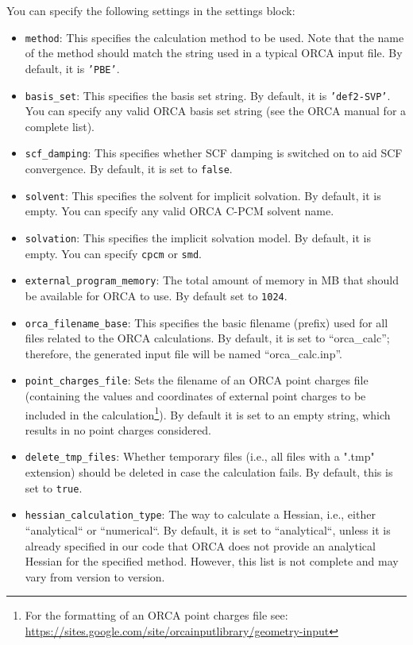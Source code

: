 \documentclass[]{tufte-book}
\begin{document}
You can specify the following settings in the settings block:
\begin{itemize}
\item \texttt{method}: This specifies the calculation method to be used.
Note that the name of the method should match the string used in a typical \textsc{ORCA} input file.
By default, it is \texttt{'PBE'}.
\item \texttt{basis\_set}: This specifies the basis set string. By default, it is \texttt{'def2-SVP'}. You can specify
any valid ORCA basis set string (see the \textsc{ORCA} manual for a complete list).
\item \texttt{scf\_damping}: This specifies whether SCF damping is switched on to aid SCF convergence. By default, it is set to \texttt{false}.
\item \texttt{solvent}: This specifies the solvent for implicit solvation. By default, it is empty. You can specify any valid \textsc{ORCA} C-PCM solvent name.
\item \texttt{solvation}: This specifies the implicit solvation model. By default, it is empty. You can specify \texttt{cpcm} or \texttt{smd}.
\item \texttt{external\_program\_memory}: The total amount of memory in MB that should be available for \textsc{ORCA} to use.
By default set to \texttt{1024}.
\item \texttt{orca\_filename\_base}: This specifies the basic filename (prefix) used for all files related to the \textsc{ORCA} calculations.
By default, it is set to ``orca\_calc''; therefore, the generated input file will be named ``orca\_calc.inp''.
\item \texttt{point\_charges\_file}: Sets the filename of an \textsc{ORCA} point charges file (containing the values and coordinates of
external point charges to be included in the calculation\footnote{For the formatting of an \textsc{ORCA} point charges file see: \url{https://sites.google.com/site/orcainputlibrary/geometry-input}}).
By default it is set to an empty string, which results
in no point charges considered.
\item \texttt{delete\_tmp\_files}: Whether temporary files (i.e., all files with a ".tmp" extension) should be deleted in case
the calculation fails. By default, this is set to \texttt{true}.
\item \texttt{hessian\_calculation\_type}: The way to calculate a Hessian, i.e., either ``analytical`` or ``numerical``. By default, it is set to ``analytical``, unless it is already specified in our code that \textsc{ORCA} does not provide an analytical Hessian for the specified method. However, this list is not complete and may vary from version to version.

\end{itemize}
\end{document}

